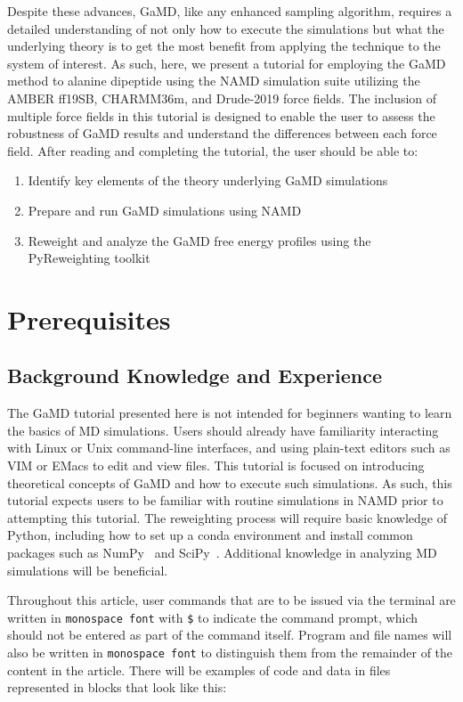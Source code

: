 \documentclass[9pt,tutorial]{livecoms}
\begin{document}
Despite these advances, GaMD, like any enhanced sampling algorithm, requires a detailed understanding of not only how to execute the simulations but what the underlying theory is to get the most benefit from applying the technique to the system of interest. As such, here, we present a tutorial for employing the GaMD method to alanine dipeptide using the NAMD simulation suite utilizing the AMBER ff19SB, CHARMM36m, and Drude-2019 force fields. The inclusion of multiple force fields in this tutorial is designed to enable the user to assess the robustness of GaMD results and understand the differences between each force field. After reading and completing the tutorial, the user should be able to:
\begin{enumerate}
    \item Identify key elements of the theory underlying GaMD simulations
    \item Prepare and run GaMD simulations using NAMD
    \item Reweight and analyze the GaMD free energy profiles using the PyReweighting toolkit
\end{enumerate}

\section{Prerequisites}
\subsection{Background Knowledge and Experience}
The GaMD tutorial presented here is not intended for beginners wanting to learn the basics of MD simulations. Users should already have familiarity interacting with Linux or Unix command-line interfaces, and using plain-text editors such as VIM or EMacs to edit and view files. This tutorial is focused on introducing theoretical concepts of GaMD and how to execute such simulations. As such, this tutorial expects users to be familiar with routine simulations in NAMD prior to attempting this tutorial. The reweighting process will require basic knowledge of Python, including how to set up a conda environment and install common packages such as NumPy~\cite{numpy} and SciPy~\cite{scipy}. Additional knowledge in analyzing MD simulations will be beneficial.

Throughout this article, user commands that are to be issued via the terminal are written in \texttt{monospace font} with \texttt{\$} to indicate the command prompt, which should not be entered as part of the command itself. Program and file names will also be written in \texttt{monospace font} to distinguish them from the remainder of the content in the article. There will be examples of code and data in files represented in blocks that look like this:
\end{document}
